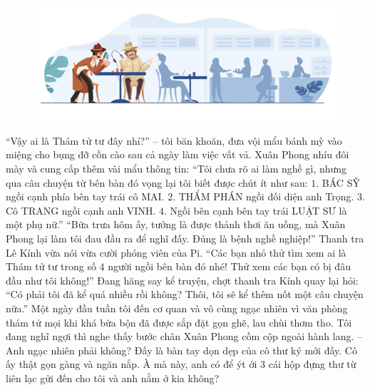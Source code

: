 	\begin{figure}[H]
			\centering
			\vspace*{-5pt}
			\captionsetup{labelformat= empty, justification=centering}
			\includegraphics[width=1\linewidth]{4}
			\vspace*{-15pt}
		\end{figure}
	“Vậy ai là Thám tử tư đây nhỉ?” -- tôi băn khoăn, đưa vội mẩu bánh mỳ vào miệng cho bụng đỡ cồn cào sau cả ngày làm việc vất vả. 
	\vskip 0.1cm
	Xuân Phong nhíu đôi mày và cung cấp thêm vài mẩu thông tin: “Tôi chưa rõ ai làm nghề gì, nhưng qua câu chuyện từ bên bàn đó vọng lại tôi biết được chút ít như sau: 
	\vskip 0.1cm
	$1.$ BÁC SỸ ngồi cạnh phía bên tay trái cô MAI. 
	\vskip 0.1cm
	$2.$ THẨM PHÁN ngồi đối diện anh Trọng.
	\vskip 0.1cm
	$3.$ Cô TRANG ngồi cạnh anh VINH. 
	\vskip 0.1cm
	$4.$ Ngồi bên cạnh bên tay trái LUẬT SƯ là một phụ nữ.” 
	\vskip 0.1cm
	“Bữa trưa hôm ấy, tưởng là được thảnh thơi ăn uống, mà Xuân Phong lại làm tôi đau đầu ra để nghĩ đấy. Đúng là bệnh nghề nghiệp!” Thanh tra Lê Kính vừa nói vừa cười phóng viên của Pi. “Các bạn nhỏ thử tìm xem ai là Thám tử tư trong số $4$ người ngồi bên bàn đó nhé! Thử xem các bạn có bị đâu đầu như tôi không!”
	\vskip 0.1cm
	Đang hăng say kể truyện, chợt thanh tra Kính quay lại hỏi: “Có phải tôi đã kể quá nhiều rồi không? Thôi, tôi sẽ kể thêm nốt một câu chuyện nữa.”
	\vskip 0.1cm
	\textbf{\color{toancuabi}{Ba chiếc hộp và cô thư ký}}
	\vskip 0.1cm
	Một ngày đầu tuần tôi đến cơ quan và vô cùng ngạc nhiên vì văn phòng thám tử mọi khi khá bừa bộn đã được sắp đặt gọn ghẽ, lau chùi thơm tho. Tôi đang nghĩ ngợi thì nghe thấy bước chân Xuân Phong cồm cộp ngoài hành lang. 
	\vskip 0.1cm
	-- Anh ngạc nhiên phải không? Đấy là bàn tay dọn dẹp của cô thư ký mới đấy. Cô ấy thật gọn gàng và ngăn nắp. À mà này, anh có để ýt ới $3$ cái hộp đựng thư từ liên lạc gửi đến cho tôi và anh nằm ở kia không? 
